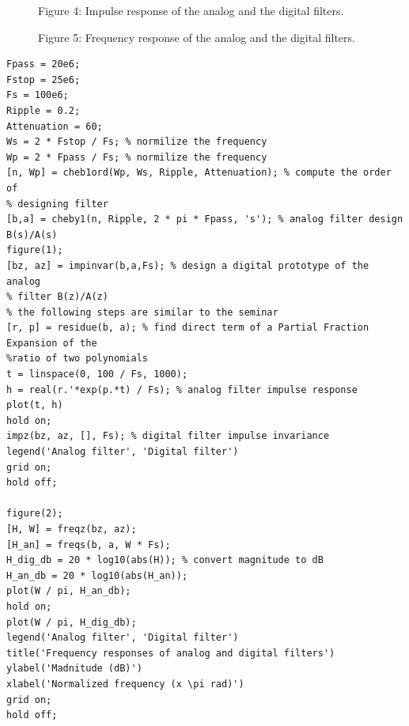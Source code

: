 \documentclass[16pt]{report}
\begin{document}
\begin{figure}[h!]
    \caption{Figure 4: Impulse response of the analog and the digital filters.}
    \label{fig:my_label}
\end{figure}
\begin{figure}
    \caption{Figure 5: Frequency response of the analog and the digital filters.}
    \label{fig:my_label}
\end{figure}
\newpage
\begin{lstlisting}
Fpass = 20e6;
Fstop = 25e6;
Fs = 100e6;
Ripple = 0.2;
Attenuation = 60;
Ws = 2 * Fstop / Fs; % normilize the frequency
Wp = 2 * Fpass / Fs; % normilize the frequency
[n, Wp] = cheb1ord(Wp, Ws, Ripple, Attenuation); % compute the order of 
% designing filter
[b,a] = cheby1(n, Ripple, 2 * pi * Fpass, 's'); % analog filter design B(s)/A(s)
figure(1);
[bz, az] = impinvar(b,a,Fs); % design a digital prototype of the analog 
% filter B(z)/A(z)
% the following steps are similar to the seminar
[r, p] = residue(b, a); % find direct term of a Partial Fraction Expansion of the
%ratio of two polynomials
t = linspace(0, 100 / Fs, 1000);
h = real(r.'*exp(p.*t) / Fs); % analog filter impulse response
plot(t, h)
hold on;
impz(bz, az, [], Fs); % digital filter impulse invariance
legend('Analog filter', 'Digital filter')
grid on;
hold off;

figure(2);
[H, W] = freqz(bz, az);
[H_an] = freqs(b, a, W * Fs);
H_dig_db = 20 * log10(abs(H)); % convert magnitude to dB
H_an_db = 20 * log10(abs(H_an));
plot(W / pi, H_an_db);
hold on;
plot(W / pi, H_dig_db);
legend('Analog filter', 'Digital filter')
title('Frequency responses of analog and digital filters')
ylabel('Madnitude (dB)')
xlabel('Normalized frequency (x \pi rad)')
grid on;
hold off;
\end{lstlisting}
\end{document}
